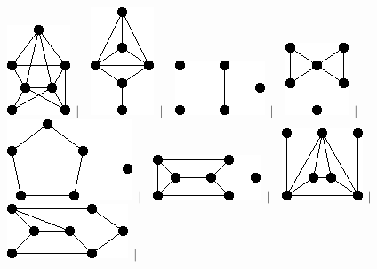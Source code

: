 \documentclass[11pt,paper=b5,footinclude,headinclude]{scrbook} %
\newtheorem{ex}{Vaja\hypertarget{sol:\theex}}[chapter]
\begin{document}
\begin{ex}
\begin{figure}
\includegraphics[scale=0.5]{smallGraphs/g_co-P7.png}$\,\mid\,$\
\includegraphics[scale=0.5]{smallGraphs/g_co-R.png}$\,\mid\,$\
\includegraphics[scale=0.5]{smallGraphs/g_co-W4.png}$\,\mid\,$\
\includegraphics[scale=0.5]{smallGraphs/g_co-W4UK1.png}$\,\mid\,$\
\includegraphics[scale=0.5]{smallGraphs/g_co-W5.png}$\,\mid\,$\
\includegraphics[scale=0.5]{smallGraphs/g_co-W6.png}$\,\mid\,$\
\includegraphics[scale=0.5]{smallGraphs/g_co-X1.png}$\,\mid\,$\
\includegraphics[scale=0.5]{smallGraphs/g_co-X10.png}$\,\mid\,$\

\end{figure}
\end{ex}
\end{document}
